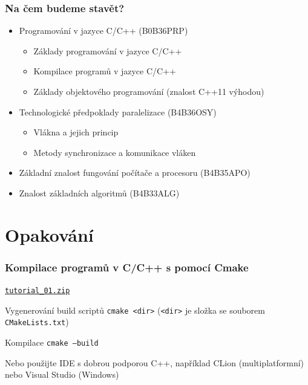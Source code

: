 \documentclass[usenames,dvipsnames,9pt]{beamer}
\newcommand{\download}[1]{\hfill\faDownload\hspace{5pt}\href{https://cw.fel.cvut.cz/wiki/_media/courses/be4m36mas/#1}{\tt #1}\\[1.3em]}
\begin{document}
\begin{frame}
  \frametitle{Na čem budeme stavět?}
  \begin{itemize}
    \item Programování v jazyce C/C++ {\small (B0B36PRP)}
          \begin{itemize}
            \item Základy programování v jazyce C/C++
            \item Kompilace programů v jazyce C/C++
            \item Základy objektového programování (znalost C++11 výhodou)
          \end{itemize}
    \pause
    \item Technologické předpoklady paralelizace {\small (B4B36OSY)}
          \begin{itemize}
            \item Vlákna a jejich princip
            \item Metody synchronizace a komunikace vláken
          \end{itemize}
    \pause
    \item Základní znalost fungování počítače a procesoru {\small (B4B35APO)}
    \pause
    \item Znalost základních algoritmů {\small (B4B33ALG)}
  \end{itemize}
\end{frame}

\section{Opakování}
\begin{frame}
  \frametitle{Kompilace programů v C/C++ s pomocí Cmake}
  \download{tutorial\_01.zip}
  \begin{block}{Vygenerování build scriptů}
    \texttt{cmake <dir>} \hspace{50pt} (\texttt{<dir>} je složka se souborem \texttt{CMakeLists.txt})
  \end{block}
  \vspace{1em}
  \begin{block}{Kompilace}
    \texttt{cmake --build}
  \end{block}

  Nebo použijte IDE s dobrou podporou C++, například CLion (multiplatformní) nebo Visual Studio (Windows)
\end{frame}
\end{document}
